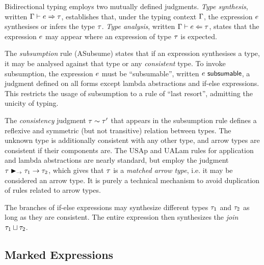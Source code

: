Bidirectional typing employs two mutually defined judgments. \emph{Type synthesis}, written
$\Gamma \vdash e \Rightarrow \tau$, establishes that, under the typing context $\Gamma$, the expression
$e$ synthesises or infers the type $\tau$. \emph{Type analysis}, written
$\Gamma \vdash e \Leftarrow \tau$, states that the expression $e$ may appear where an expression of
type $\tau$ is expected.

The \emph{subsumption} rule (ASubsume) states that if an expression synthesises a type, it may be
analysed against that type or any \emph{consistent} type. To invoke subsumption, the expression
$e$ must be ``subsumable'', written $e ~{\normalfont{\normalfont\textsf{subsumable}}}$, a judgment defined on all forms except
lambda abstractions and if-else expressions. This restricts the usage of subsumption to a rule of
``last resort'', admitting the unicity of typing.




The \emph{consistency} judgment $\tau \sim \tau'$ that appears in the subsumption rule
defines a reflexive and symmetric (but not transitive) relation between types. The unknown type is
additionally consistent with any other type, and arrow types are consistent if their components are.
The USAp and UALam rules for application and lambda abstractions are nearly standard, but employ the
judgment $\tau \blacktriangleright_{\to} \tau_1 \to \tau_2$, which gives that $\tau$ is a \emph{matched arrow
type}, i.e. it may be considered an arrow type. It is purely a technical mechanism to avoid
duplication of rules related to arrow types.



The branches of if-else expressions may synthesize different types $\tau_1$ and $\tau_2$ as long as
they are consistent. The entire expression then synthesizes the \emph{join}
$\tau_1 \sqcup \tau_2$.

\subsection{Marked Expressions}
\label{sec:calculus-mexp}

